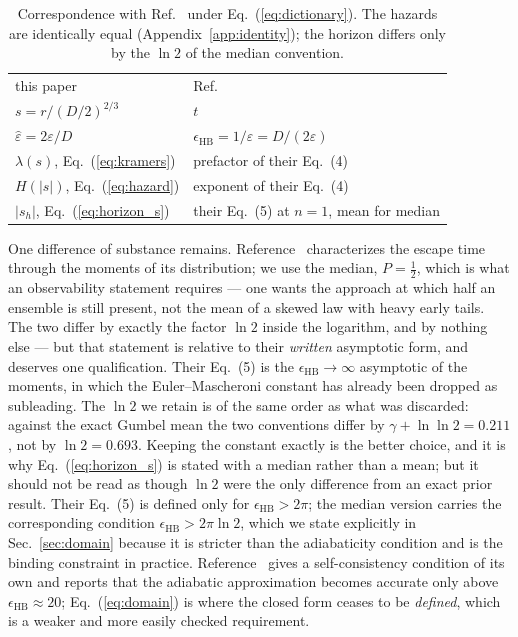 \documentclass[%
 aip,
 cha,
 amsmath,amssymb,
 reprint,
 superscriptaddress,
 floatfix,
]{revtex4-2}
\newcommand{\Sig}{\hat\varepsilon}
\begin{document}
\begin{table}[b]
\caption{\label{tab:dictionary}%
Correspondence with Ref.~\cite{HerbertBouchet2017} under Eq.~(\ref{eq:dictionary}).  The hazards are identically equal (Appendix~\ref{app:identity}); the horizon differs only by the $\ln2$ of the median convention.}
\begin{ruledtabular}
\begin{tabular}{ll}
this paper & Ref.~\cite{HerbertBouchet2017} \\
\colrule
$s=r/(D/2)^{2/3}$ & $t$ \\
$\Sig=2\varepsilon/D$ & $\epsilon_{\mathrm{HB}}=1/\Sig=D/(2\varepsilon)$ \\
$\lambda(s)$, Eq.~(\ref{eq:kramers}) & prefactor of their Eq.~(4) \\
$H(|s|)$, Eq.~(\ref{eq:hazard}) & exponent of their Eq.~(4) \\
$|s_h|$, Eq.~(\ref{eq:horizon_s}) & their Eq.~(5) at $n=1$, mean for median \\
\end{tabular}
\end{ruledtabular}
\end{table}

One difference of substance remains.  Reference~\cite{HerbertBouchet2017} characterizes the escape time through the moments of its distribution; we use the median, $P=\tfrac12$, which is what an observability statement requires --- one wants the approach at which half an ensemble is still present, not the mean of a skewed law with heavy early tails.  The two differ by exactly the factor $\ln2$ inside the logarithm, and by nothing else --- but that statement is relative to their \emph{written} asymptotic form, and deserves one qualification.  Their Eq.~(5) is the $\epsilon_{\mathrm{HB}}\to\infty$ asymptotic of the moments, in which the Euler--Mascheroni constant has already been dropped as subleading.  The $\ln2$ we retain is of the same order as what was discarded: against the exact Gumbel mean the two conventions differ by $\gamma+\ln\ln2=0.211$, not by $\ln2=0.693$.  Keeping the constant exactly is the better choice, and it is why Eq.~(\ref{eq:horizon_s}) is stated with a median rather than a mean; but it should not be read as though $\ln2$ were the only difference from an exact prior result.  Their Eq.~(5) is defined only for $\epsilon_{\mathrm{HB}}>2\pi$; the median version carries the corresponding condition $\epsilon_{\mathrm{HB}}>2\pi\ln2$, which we state explicitly in Sec.~\ref{sec:domain} because it is stricter than the adiabaticity condition and is the binding constraint in practice.  Reference~\cite{HerbertBouchet2017} gives a self-consistency condition of its own and reports that the adiabatic approximation becomes accurate only above $\epsilon_{\mathrm{HB}}\approx20$; Eq.~(\ref{eq:domain}) is where the closed form ceases to be \emph{defined}, which is a weaker and more easily checked requirement.
\end{document}
